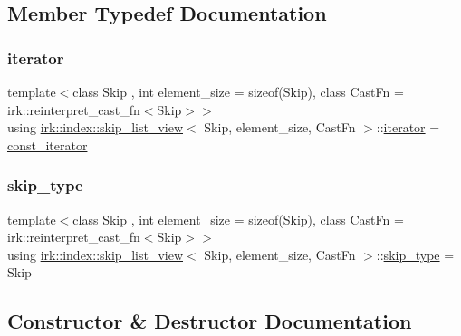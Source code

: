 \subsection{Member Typedef Documentation}
\mbox{\label{classirk_1_1index_1_1skip__list__view_a7e7a81a64ede6bcd7c49bc05cd6243d3}} 
\subsubsection{\texorpdfstring{iterator}{iterator}}
{\footnotesize\ttfamily template$<$class Skip , int element\+\_\+size = sizeof(\+Skip), class Cast\+Fn  = irk\+::reinterpret\+\_\+cast\+\_\+fn$<$\+Skip$>$$>$ \\
using \mbox{\hyperlink{classirk_1_1index_1_1skip__list__view}{irk\+::index\+::skip\+\_\+list\+\_\+view}}$<$ Skip, element\+\_\+size, Cast\+Fn $>$\+::\mbox{\hyperlink{classirk_1_1index_1_1skip__list__view_a7e7a81a64ede6bcd7c49bc05cd6243d3}{iterator}} =  \mbox{\hyperlink{structirk_1_1index_1_1skip__list__view_1_1const__iterator}{const\+\_\+iterator}}}

\mbox{\label{classirk_1_1index_1_1skip__list__view_a7fa2224428803eee24062bb123978755}} 
\subsubsection{\texorpdfstring{skip\+\_\+type}{skip\_type}}
{\footnotesize\ttfamily template$<$class Skip , int element\+\_\+size = sizeof(\+Skip), class Cast\+Fn  = irk\+::reinterpret\+\_\+cast\+\_\+fn$<$\+Skip$>$$>$ \\
using \mbox{\hyperlink{classirk_1_1index_1_1skip__list__view}{irk\+::index\+::skip\+\_\+list\+\_\+view}}$<$ Skip, element\+\_\+size, Cast\+Fn $>$\+::\mbox{\hyperlink{classirk_1_1index_1_1skip__list__view_a7fa2224428803eee24062bb123978755}{skip\+\_\+type}} =  Skip}



\subsection{Constructor \& Destructor Documentation}
\mbox{\label{classirk_1_1index_1_1skip__list__view_a97abe4d23715e60ef30892bdd8ad9cd7}} 
